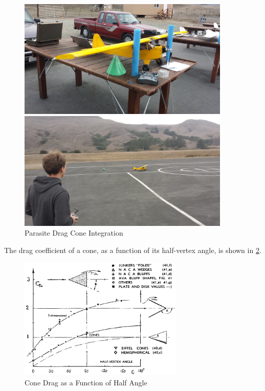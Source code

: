 \begin{figure}[H]
\begin{center}
\begin{minipage}[b]{0.45\linewidth}
  \centering
    \includegraphics[width=0.9\textwidth]{figures/coneInt1.jpg}
\end{minipage}
\begin{minipage}[b]{0.45\linewidth}
  \centering
    \includegraphics[width=0.9\textwidth]{figures/coneInt2.jpg}
\end{minipage}
\end{center}
\caption{Parasite Drag Cone Integration}
\label{fig:coneIntegration}
\end{figure}

The drag coefficient of a cone, as a function of its half-vertex angle, is shown in \ref{fig:coneDrag}.

\begin{figure}[H]
	\centering
	\includegraphics[width=0.7\textwidth]{figures/coneDrag.png} \caption{Cone Drag as a Function of Half Angle\cite{hoernerDrag}} \label{fig:coneDrag}
\end{figure}

